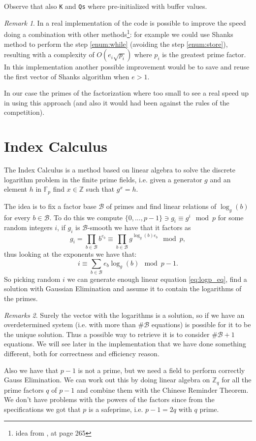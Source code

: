 \documentclass{article}
\newcommand{\ZZ}{\mathbb{Z}}
\newcommand{\F}{\mathbb{F}}
\newcommand{\BB}{\mathcal{B}}
\theoremstyle{plain}
\theoremstyle{remark}
\newtheorem{rem}{Remark}
\newtheorem{rems}[rem]{Remarks}
\theoremstyle{definition}
\begin{document}
Observe that also \verb|K| and \verb|Qs| where pre-initialized with buffer values. 

\begin{rem} 
	In a real implementation of the code is possible to improve the speed doing a combination with other methods\footnote{idea from \cite{stinson}, at page 265}: for example we could use Shanks method to perform the step \ref{enum:while} (avoiding the step \ref{enum:store}), resulting with a complexity of $O(e_i \sqrt{p_i})$ where $p_i$ is the greatest prime factor. In this implementation another possible improvement would be to save and reuse the first vector of Shanks algorithm when $e>1$. 

	In our case the primes of the factorization where too small to see a real speed up in using this approach (and also it would had been against the rules of the competition).
\end{rem}


\section{Index Calculus}

The Index Calculus is a method based on linear algebra to solve the discrete logarithm problem in the finite prime fields, i.e. given a generator $g$ and an element $h$ in $ \F_p$ find $x \in \ZZ$ such that $g^x = h$. 

The idea is to fix a factor base $\mathcal{B}$ of primes and find linear relations of $\log_g(b)$ for every $b \in \mathcal{B}$. To do this we compute $\{0,...,p-1\} \ni g_i \equiv g^i \mod p$ for some random integers $i$, if $g_i$ is $\mathcal{B}$-smooth we have that it factors as 
\[
g_i = \prod_{b \in \BB}b^{e_b} \equiv \prod_{b \in \BB} g^{\log_g(b) e_b} \mod p,
\]
thus looking at the exponents we have that:
\begin{equation}
	\label{eq:logp_eq}
	i \equiv \sum_{b \in \BB} e_b \log_g(b) \mod p-1 . 
\end{equation}
So picking random $i$ we can generate enough linear equation \ref{eq:logp_eq}, find a solution with Gaussian Elimination and assume it to contain the logarithms of the primes.

\begin{rems} \label{rem:num_eq}
	Surely the vector with the logarithms is a solution, so if we have an overdetermined system (i.e. with more than $\#\BB$ equations) is possible for it to be the unique solution. Thus a possible way to retrieve it is to consider $\#\BB +1$ equations. We will see later in the implementation that we have done something different, both for correctness and efficiency reason. 

	Also we have that $p-1$ is not a prime, but we need a field to perform correctly Gauss Elimination. We can work out this by doing linear algebra on $\ZZ_q$ for all the prime factors $q$ of $p-1$ and combine them with the Chinese Reminder Theorem. We don't have problems with the powers of the factors since from the specifications we got that $p$ is a safeprime, i.e. $p-1 = 2q$ with $q$ prime. 
\end{rems}
\end{document}
